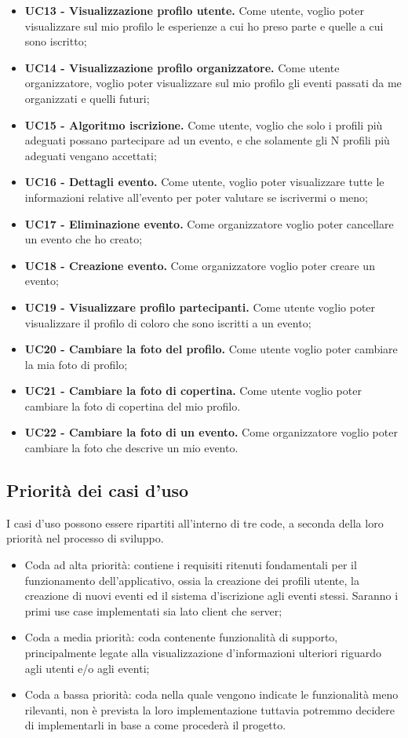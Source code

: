 \begin{itemize}
    \item \textbf{UC13 - Visualizzazione profilo utente.} Come utente, voglio poter visualizzare sul mio profilo le esperienze a cui ho preso parte e quelle a cui sono iscritto;
    \item \textbf{UC14 - Visualizzazione profilo organizzatore.} Come utente organizzatore, voglio poter visualizzare sul mio profilo gli eventi passati da me organizzati e quelli futuri;
    \item \textbf{UC15 - Algoritmo iscrizione.} Come utente, voglio che solo i profili più adeguati possano partecipare ad un evento, e che solamente gli N profili più adeguati vengano accettati;
    \item \textbf{UC16 - Dettagli evento.} Come utente, voglio poter visualizzare tutte le informazioni relative all’evento per poter valutare se iscrivermi o meno;
    \item \textbf{UC17 - Eliminazione evento.} Come organizzatore voglio poter cancellare un evento che ho creato;
    \item \textbf{UC18 - Creazione evento.} Come organizzatore voglio poter creare un evento;
    \item \textbf{UC19 - Visualizzare profilo partecipanti.} Come utente voglio poter visualizzare il profilo di coloro che sono iscritti a un evento;
    \item \textbf{UC20 - Cambiare la foto del profilo.} Come utente voglio poter cambiare la mia foto di profilo;
    \item \textbf{UC21 - Cambiare la foto di copertina.} Come utente voglio poter cambiare la foto di copertina del mio profilo.
    \item \textbf{UC22 - Cambiare la foto di un evento.} Come organizzatore voglio poter cambiare la foto che descrive un mio evento.
\end{itemize}
\clearpage

\subsection{Priorità dei casi d'uso}

I casi d'uso possono essere ripartiti all'interno di tre code, a seconda della loro priorità nel processo di sviluppo.
\begin{itemize}
    \item Coda ad alta priorità: contiene i requisiti ritenuti fondamentali per il funzionamento dell'applicativo, ossia la creazione dei profili utente, la creazione di nuovi eventi ed il sistema d'iscrizione agli eventi stessi. Saranno i primi use case implementati sia lato client che server;
    \item Coda a media priorità: coda contenente funzionalità di supporto, principalmente legate alla visualizzazione d'informazioni ulteriori riguardo agli utenti e/o agli eventi;
    \item Coda a bassa priorità: coda nella quale vengono indicate le funzionalità meno rilevanti, non è prevista la loro implementazione tuttavia potremmo decidere di implementarli in base a come procederà il progetto.
\end{itemize}

